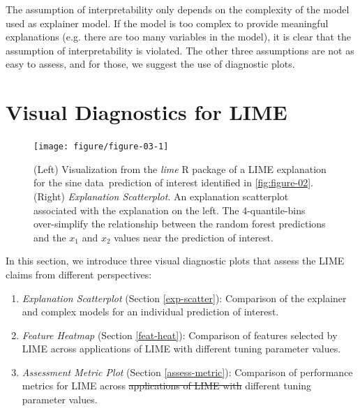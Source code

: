 \documentclass[AMS,STIX2COL]{WileyNJD-v2}\usepackage[]{graphicx}\usepackage[]{color}
\newenvironment{knitrout}{}{} %
\newcommand{\data}{sine data}
\begin{document}
The assumption of interpretability only depends on the complexity of the model used as explainer model. If the model is too complex to provide meaningful explanations (e.g. there are too many variables in the model), it is clear that the assumption of interpretability is violated. The other three assumptions are not as easy to assess, and for those, we suggest the use of diagnostic plots.

\section{Visual Diagnostics for LIME} \label{diagnostics}







\begin{figure}[!thp]
\begin{knitrout}
\color{fgcolor}

{\centering \texttt{[image: figure/figure-03-1]} 

}


\end{knitrout}
\caption{(Left) Visualization from the \emph{lime} R package of a LIME explanation for the \data \ prediction of interest identified in \autoref{fig:figure-02}. (Right) \emph{Explanation Scatterplot}.  An explanation scatterplot associated with the explanation on the left. The 4-quantile-bins over-simplify the relationship between the random forest predictions and the $x_1$ and $x_2$ values near the prediction of interest.}
\label{fig:figure-03}
\end{figure}

In this section, we introduce three visual diagnostic plots that assess the LIME claims from different perspectives:

\begin{enumerate}
\item \emph{Explanation Scatterplot} (Section \ref{exp-scatter}): Comparison of the explainer and complex models for an individual prediction of interest.
\item \emph{Feature Heatmap} (Section \ref{feat-heat}): Comparison of features selected by LIME across applications of LIME with different tuning parameter values.
\item \emph{Assessment Metric Plot} (Section \ref{assess-metric}): Comparison of performance metrics for LIME across \sout{applications of LIME with} different tuning parameter values. 
\end{enumerate}
\end{document}
